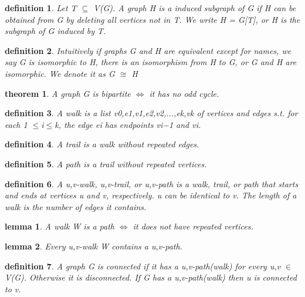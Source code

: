 \documentclass[2pt]{article}
\newtheorem{theorem}{theorem}[section]  %
\newtheorem{definition}{definition}
\newtheorem{lemma}{lemma}
\begin{document}
\begin{CJK*}{UTF8}{bkai}
\begin{paracol}{2}
    \begin{definition}
        Let T $\subseteq$ V(G). A graph H is a induced subgraph of G if H can be obtained
 from G by deleting all vertices not in T. We write H = G[T], or H is the
 subgraph of G induced by T.       
    \end{definition}

    \begin{definition}
         Intuitively if graphs G and H are equivalent except for names, we say G is
 isomorphic to H, there is an isomorphism from H to G, or G and H are
 isomorphic. We denote it as G $\cong$ H
    \end{definition}

    \begin{theorem}
        A graph G is bipartite $\iff$ it has no odd cycle.
    \end{theorem}

    \begin{definition}
        A walk is a list v0,e1,v1,e2,v2,...,ek,vk of vertices and edges s.t. for each
 1 $\leq$i$\leq$k, the edge ei has endpoints vi−1 and vi.
    \end{definition}

    \begin{definition}
        A trail is a walk without repeated edges.
    \end{definition}

    \begin{definition}
         A path is a trail without repeated vertices.
    \end{definition}

    \begin{definition}
         A u,v-walk, u,v-trail, or u,v-path is a walk, trail, or path that starts and ends
 at vertices u and v, respectively. u can be identical to v. The length of a walk
 is the number of edges it contains.
    \end{definition}

    \begin{lemma}
        A walk W is a path $\iff$ it does not have repeated vertices.
    \end{lemma}

    \switchcolumn

    \begin{lemma}
        Every u,v-walk W contains a u,v-path.
    \end{lemma}

    \begin{definition}
         A graph G is connected if it has a u,v-path(walk) for every u,v $\in$ V(G).
 Otherwise it is disconnected. If G has a u,v-path(walk) then u is connected to
 v.
    \end{definition}


\end{paracol}
\end{CJK*}
\end{document}
